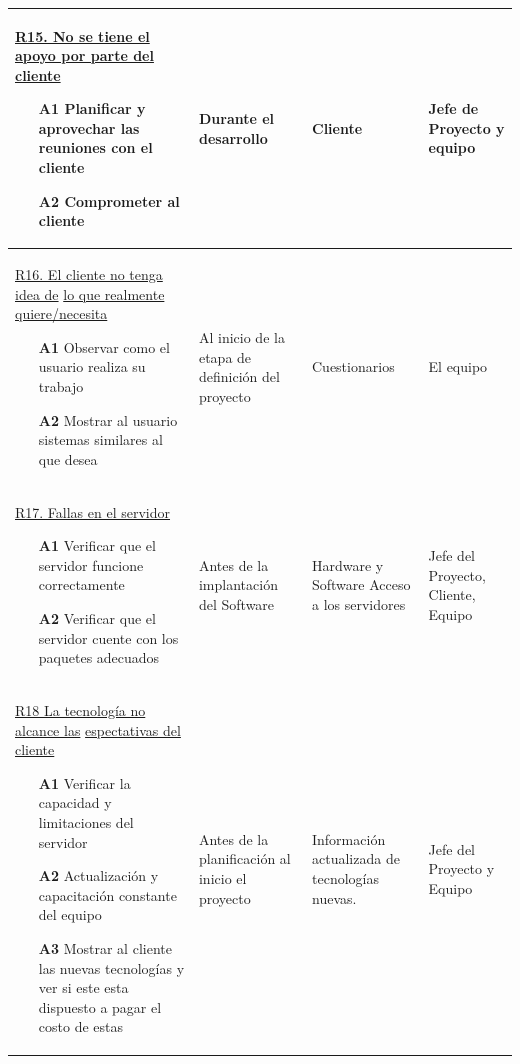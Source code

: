 \documentclass[11pt,letterpaper]{report}
\begin{document}
\begin{longtable}{|l|p{1in}| p{1in} |p{0.7in}|}
	 \begin{minipage}{2.5in}
		\vskip 6pt
	  	\underline{R15. No se tiene el apoyo por parte del }
	  	\underline{cliente}
	  \begin{itemize}
	   		\item[{\bf A1}] Planificar y aprovechar las reuniones con el cliente
	   		\item[{\bf A2}] Comprometer al cliente
	  \end{itemize}
		   	\vskip 1pt
	 \end{minipage}	
		& Durante el desarrollo	& Cliente	& Jefe de  Proyecto y equipo\\\hline


	 \begin{minipage}{2.5in}
		\vskip 6pt
	  	\underline{R16. El cliente no tenga idea de}
	  	\underline{lo que realmente quiere/necesita}
	  \begin{itemize}
	   		\item[{\bf A1}] Observar como el usuario realiza su trabajo
	   		\item[{\bf A2}] Mostrar al usuario sistemas similares al que desea
	  \end{itemize}
		   	\vskip 1pt
	 \end{minipage}	
		& Al inicio de la etapa de definición del proyecto & Cuestionarios & El equipo\\\hline	
		
	 \begin{minipage}{2.5in}
		\vskip 6pt
	  	\underline{R17. Fallas en el servidor}
	 	\begin{itemize}
	   		\item[{\bf A1}] Verificar que el servidor funcione correctamente
	   		\item[{\bf A2}] Verificar que el servidor cuente con los paquetes adecuados
	 	\end{itemize}
		\vskip 1pt
	 \end{minipage}	
			& Antes de la implantación del Software	& Hardware y Software Acceso a los servidores & Jefe del Proyecto, Cliente, Equipo\\\hline	

	 \begin{minipage}{2.5in}
		\vskip 6pt
	  	\underline{R18 La tecnología no alcance las}
	  	\underline{ espectativas del cliente }
	 	\begin{itemize}
	   		\item[{\bf A1}] Verificar la capacidad y limitaciones del servidor 
	   		\item[{\bf A2}] Actualización y capacitación constante del equipo
	   		\item[{\bf A3}] Mostrar al cliente las nuevas tecnologías y ver si este esta dispuesto a pagar el costo de estas
	 	\end{itemize}
		\vskip 1pt
	 \end{minipage}	
			& Antes de la planificación al inicio el proyecto & Información actualizada de  tecnologías nuevas. & Jefe del Proyecto y Equipo \\\hline			


\end{longtable}
\end{document}
